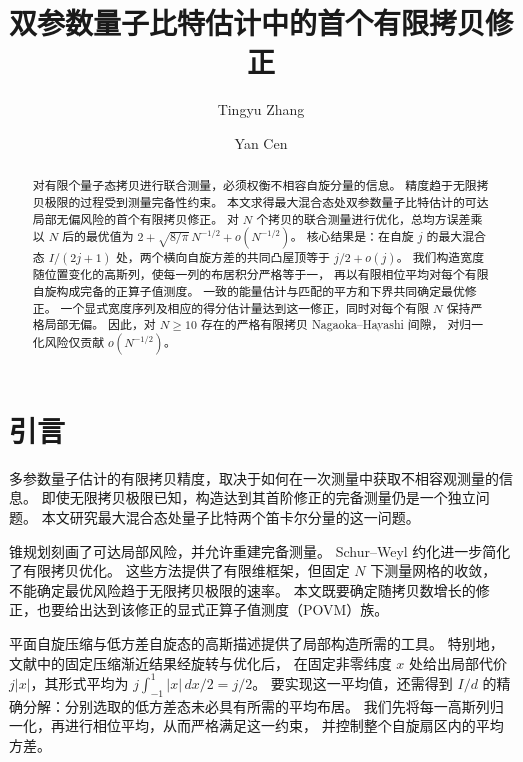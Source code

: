 \documentclass[aps,pra,reprint,superscriptaddress,longbibliography]{revtex4-2}
\theoremstyle{remark}
\begin{document}
\title{双参数量子比特估计中的首个有限拷贝修正}
\author{Tingyu Zhang}
\author{Yan Cen}

\date[]{}
\begin{abstract}
对有限个量子态拷贝进行联合测量，必须权衡不相容自旋分量的信息。
精度趋于无限拷贝极限的过程受到测量完备性约束。
本文求得最大混合态处双参数量子比特估计的可达局部无偏风险的首个有限拷贝修正。
对 $N$ 个拷贝的联合测量进行优化，总均方误差乘以 $N$ 后的最优值为
$2+\sqrt{8/\pi}\,N^{-1/2}+o(N^{-1/2})$。
核心结果是：在自旋 $j$ 的最大混合态 $I/(2j+1)$ 处，两个横向自旋方差的共同凸屋顶等于 $j/2+o(j)$。
我们构造宽度随位置变化的高斯列，使每一列的布居积分严格等于一，
再以有限相位平均对每个有限自旋构成完备的正算子值测度。
一致的能量估计与匹配的平方和下界共同确定最优修正。
一个显式宽度序列及相应的得分估计量达到这一修正，同时对每个有限 $N$ 保持严格局部无偏。
因此，对 $N\geq10$ 存在的严格有限拷贝 Nagaoka--Hayashi 间隙，
对归一化风险仅贡献 $o(N^{-1/2})$。
\end{abstract}

\maketitle

\section{引言}\label{sec:introduction}

多参数量子估计的有限拷贝精度，取决于如何在一次测量中获取不相容观测量的信息。
即使无限拷贝极限已知，构造达到其首阶修正的完备测量仍是一个独立问题。
本文研究最大混合态处量子比特两个笛卡尔分量的这一问题。

锥规划刻画了可达局部风险，并允许重建完备测量\cite{HayashiOuyang2023}。
Schur--Weyl 约化进一步简化了有限拷贝优化\cite{ZhangHayashi2026}。
这些方法提供了有限维框架，但固定 $N$ 下测量网格的收敛，
不能确定最优风险趋于无限拷贝极限的速率。
本文既要确定随拷贝数增长的修正，也要给出达到该修正的显式正算子值测度（POVM）族。

平面自旋压缩与低方差自旋态的高斯描述提供了局部构造所需的工具\cite{He2011,Dammeier2015}。
特别地，文献\cite[定理~4]{Dammeier2015}中的固定压缩渐近结果经旋转与优化后，
在固定非零纬度 $x$ 处给出局部代价 $j|x|$，其形式平均为
$j\int_{-1}^1|x|\,dx/2=j/2$。
要实现这一平均值，还需得到 $I/d$ 的精确分解：分别选取的低方差态未必具有所需的平均布居。
我们先将每一高斯列归一化，再进行相位平均，从而严格满足这一约束，
并控制整个自旋扇区内的平均方差。
\end{document}
